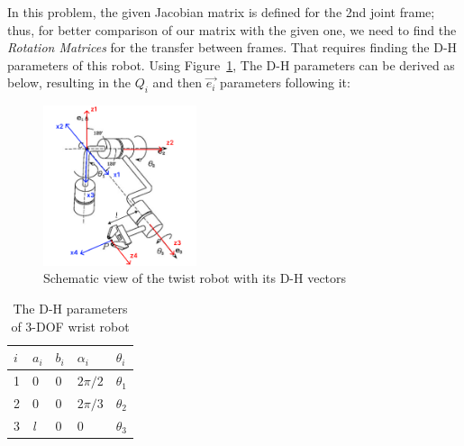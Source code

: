 \documentclass[conference]{IEEEtran}
\begin{document}
In this problem, the given Jacobian matrix is defined for the 2nd joint frame; thus, for better comparison of our matrix with the given one, we need to find the \textit{Rotation Matrices} for the transfer between frames. That requires finding the D-H parameters of this robot. Using Figure~\ref{fig:prob3}, The D-H parameters can be derived as below, resulting in the \(Q_i\) and then \(\vec{e_i}\) parameters following it:

\begin{figure}[htbp]
    \centerline{\includegraphics[width=0.4\textwidth]{figures/prob3.png}}
    \caption{Schematic view of the twist robot with its D-H vectors}
    \label{fig:prob3}
\end{figure}

\begin{table}[htbp]
    \caption{The D-H parameters of 3-DOF wrist robot}
    \def\arraystretch{1.25}
    \begin{center}
        \begin{tabular}{|Y|Y|Y|Y|Y|}
            \hline
            $i$ & $a_i$      & $b_i$ & $\alpha_i$ & $\theta_i$ \\
               & 0          & 0     & $2\pi / 2$ & $\theta_1$ \\
               & 0          & 0     & $2\pi / 3$ & $\theta_2$ \\
               & \textit{l} & 0     & 0          & $\theta_3$ \\
            \hline
        \end{tabular}
    \end{center}
\end{table}
\end{document}
